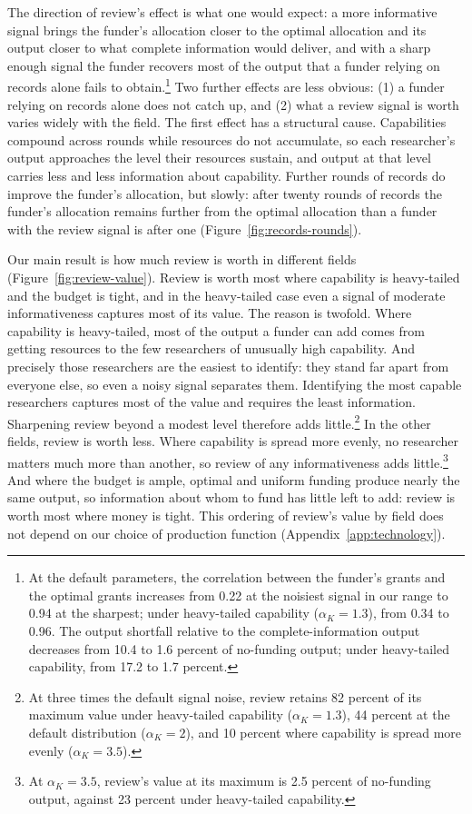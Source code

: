 \documentclass[article, 11pt, reqno]{amsart}
\theoremstyle{named}
\begin{document}
The direction of review's effect is what one would expect: a more informative signal brings the funder's allocation closer to the optimal allocation and its output closer to what complete information would deliver, and with a sharp enough signal the funder recovers most of the output that a funder relying on records alone fails to obtain.\footnote{At the default parameters, the correlation between the funder's grants and the optimal grants increases from 0.22 at the noisiest signal in our range to 0.94 at the sharpest; under heavy-tailed capability ($\alpha_K = 1.3$), from 0.34 to 0.96. The output shortfall relative to the complete-information output decreases from 10.4 to 1.6 percent of no-funding output; under heavy-tailed capability, from 17.2 to 1.7 percent.} Two further effects are less obvious: (1) a funder relying on records alone does not catch up, and (2) what a review signal is worth varies widely with the field. The first effect has a structural cause. Capabilities compound across rounds while resources do not accumulate, so each researcher's output approaches the level their resources sustain, and output at that level carries less and less information about capability. Further rounds of records do improve the funder's allocation, but slowly: after twenty rounds of records the funder's allocation remains further from the optimal allocation than a funder with the review signal is after one (Figure~\ref{fig:records-rounds}).



Our main result is how much review is worth in different fields (Figure~\ref{fig:review-value}). Review is worth most where capability is heavy-tailed and the budget is tight, and in the heavy-tailed case even a signal of moderate informativeness captures most of its value. The reason is twofold. Where capability is heavy-tailed, most of the output a funder can add comes from getting resources to the few researchers of unusually high capability. And precisely those researchers are the easiest to identify: they stand far apart from everyone else, so even a noisy signal separates them. Identifying the most capable researchers captures most of the value and requires the least information. Sharpening review beyond a modest level therefore adds little.\footnote{At three times the default signal noise, review retains 82 percent of its maximum value under heavy-tailed capability ($\alpha_K = 1.3$), 44 percent at the default distribution ($\alpha_K = 2$), and 10 percent where capability is spread more evenly ($\alpha_K = 3.5$).} In the other fields, review is worth less. Where capability is spread more evenly, no researcher matters much more than another, so review of any informativeness adds little.\footnote{At $\alpha_K = 3.5$, review's value at its maximum is 2.5 percent of no-funding output, against 23 percent under heavy-tailed capability.} And where the budget is ample, optimal and uniform funding produce nearly the same output, so information about whom to fund has little left to add: review is worth most where money is tight. This ordering of review's value by field does not depend on our choice of production function (Appendix~\ref{app:technology}).
\end{document}
